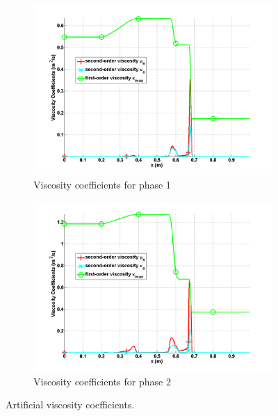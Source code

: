 \documentclass{anstrans}
\begin{document}
\begin{figure}[H]
        
        \begin{subfigure}[b]{0.495\textwidth}
                \centering
                \includegraphics[width=\textwidth]{plots/relaxation_two_phases_liquid_viscosity_kappa_mu.png}
                \caption{Viscosity coefficients for phase 1}
                \label{fig:viscosity_coeff_liq}
        \end{subfigure}        
				
        \begin{subfigure}[b]{0.495\textwidth}
                \centering
                \includegraphics[width=\textwidth]{plots/relaxation_two_phases_vapor_viscosity_kappa_mu.png}
                \caption{Viscosity coefficients for phase $2$}
                \label{fig:viscosity_coeff_vap}
        \end{subfigure}        
        \caption{Artificial viscosity coefficients.}
\end{figure}
\end{document}
